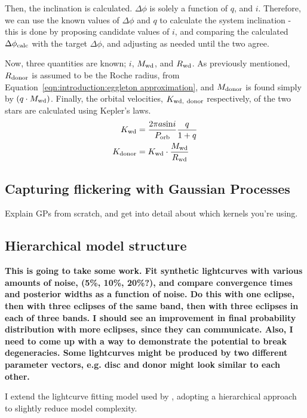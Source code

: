 Then, the inclination is calculated. $\Delta \phi$ is solely a function of $q$, and $i$. Therefore, we can use the known values of $\Delta\phi$ and $q$ to calculate the system inclination - this is done by proposing candidate values of $i$, and comparing the calculated $\Delta \phi_{\rm calc}$ with the target $\Delta \phi$, and adjusting as needed until the two agree.  

Now, three quantities are known; $i$, $M_{\rm wd}$, and $R_{\rm wd}$. As previously mentioned, $R_{\rm donor}$ is assumed to be the Roche radius, from Equation~\ref{eqn:introduction:eggleton approximation}, and $M_{\rm donor}$ is found simply by $(q \cdot M_{\rm wd})$. Finally, the orbital velocities, $K_{\rm wd,\ donor}$ respectively, of the two stars are calculated using Kepler's laws.
\begin{align}
    K_{\rm wd} &= \frac{2\pi a \mathrm{sin}i}{P_{\rm orb}} \frac{q}{1+q} \\
    K_{\rm donor} &= K_{\rm wd} \cdot \frac{M_{\rm wd}}{R_{\rm wd}}
\end{align}


\subsection{Capturing flickering with Gaussian Processes}
Explain GPs from scratch, and get into detail about which kernels you're using. 


\subsection{Hierarchical model structure}
{\bf This is going to take some work. Fit synthetic lightcurves with various amounts of noise, (5\%, 10\%, 20\%?), and compare convergence times and posterior widths as a function of noise. Do this with one eclipse, then with three eclipses of the same band, then with three eclipses in each of three bands.
I should see an improvement in final probability distribution with more eclipses, since they can communicate.
Also, I need to come up with a way to demonstrate the potential to break degeneracies. Some lightcurves might be produced by two different parameter vectors, e.g. disc and donor might look similar to each other. }

I extend the lightcurve fitting model used by \citet{McAllister2019}, adopting a hierarchical approach to slightly reduce model complexity. 

